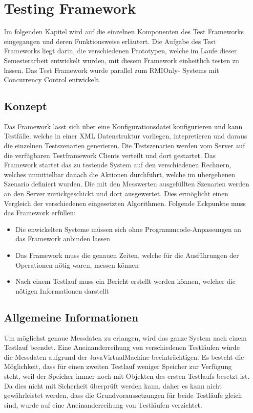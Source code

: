 \chapter{Testing Framework}
Im folgenden Kapitel wird auf die einzelnen Komponenten des Test Frameworks eingegangen und deren Funktionsweise erläutert. Die Aufgabe des Test Frameworks liegt darin, die verschiedenen Prototypen, welche im Laufe dieser Semesterarbeit entwickelt wurden, mit diesem Framework einheitlich testen zu lassen. Das Test Framework wurde parallel zum RMIOnly- Systems mit Concurrency Control entwickelt.

\section{Konzept}
Das Framework lässt sich über eine Konfigurationsdatei konfigurieren und kann Testfälle, welche in einer XML Datenstruktur vorliegen, intepretieren und daraus die einzelnen Testszenarien generieren. Die Testszenarien werden vom Server auf die verfügbaren Testframework Clients verteilt und dort gestartet. Das Framework startet das zu testende System auf den verschiedenen Rechnern, welches unmittelbar danach die Aktionen durchführt, welche im übergebenen Szenario definiert wurden.\newline
Die mit den Messwerten ausgefüllten Szenarien werden an den Server zurückgeschickt und dort ausgewertet. Dies ermöglicht einen Vergleich der verschiedenen eingesetzten Algorithmen. Folgende Eckpunkte muss das Framework erfüllen:

\begin{itemize}
\item Die enwickelten Systeme müssen sich ohne Programmcode-Anpassungen an das Framework anbinden lassen
\item Das Framework muss die genauen Zeiten, welche für die Ausführungen der Operationen nötig waren, messen können
\item Nach einem Testlauf muss ein Bericht erstellt werden können, welcher die nötigen Informationen darstellt
\end{itemize}

\section{Allgemeine Informationen}
\label{sec:allgInformationen}

Um möglichst genaue Messdaten zu erlangen, wird das ganze System nach einem Testlauf beendet. Eine Aneinanderreihung von verschiedenen Testläufen würde die Messdaten aufgrund der JavaVirtualMachine beeinträchtigen. Es besteht die Möglichkeit, dass für einen zweiten Testlauf weniger Speicher zur Verfügung steht, weil der Speicher immer noch mit Objekten des ersten Testlaufs besetzt ist. Da dies nicht mit Sicherheit überprüft werden kann, daher es kann nicht gewährleistet werden, dass die Grundvoraussetzungen für beide Testläufe gleich sind, wurde auf eine Aneinanderreihung von Testläufen verzichtet.

